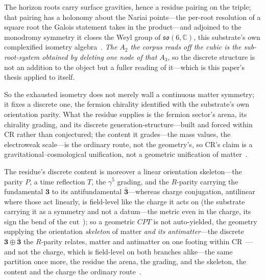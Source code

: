 \documentclass[11pt,a4paper]{article}
\theoremstyle{definition}
\newcommand{\so}{\mathfrak{so}}
\begin{document}
\begin{enumerate}
The horizon roots carry surface gravities, hence a residue pairing on the
triple; that pairing has a holonomy about the Nariai points---the per-root resolution of a square root the
Galois statement takes in the product---and adjoined to the
monodromy symmetry it closes the Weyl group of
$\so(6,\mathbb{C})$, this substrate's own complexified isometry
algebra~\cite{JanzenGroupoid, JanzenAlgebroid}. \emph{The $A_2$ the corpus reads off the cubic is the
sub-root-system obtained by deleting one node of that $A_3$}, so the discrete structure is not an addition to
the object but a fuller reading of it---which is this paper's thesis applied to itself.


So the exhausted isometry does not merely wall a continuous matter symmetry; it
fixes a discrete one, the fermion chirality identified with the substrate's own
orientation parity. What the residue supplies is the fermion sector's arena, its chirality grading, and its discrete generation-structure---built and forced within CR rather than conjectured; the content it grades---the mass values, the electroweak scale---is the ordinary route, not the geometry's, so CR's claim is a gravitational--cosmological unification, not a geometric unification of matter~\cite{JanzenBoundary}. 

The residue's discrete content is moreover a linear orientation skeleton---the parity $P$, a time reflection $T$, the $\gamma^5$ grading, and the $R$-parity carrying the fundamental $\mathbf 3$ to its antifundamental $\bar{\mathbf 3}$---whereas charge conjugation, antilinear where those act linearly, is field-level like the charge it acts on (the substrate carrying it as a symmetry and not a datum---the metric even in the charge, its sign the bend of the cut~\cite{JanzenRange}); so a geometric $CPT$ is not auto-yielded, the geometry supplying the orientation \emph{skeleton} of matter \emph{and its antimatter}---the discrete $\mathbf 3\oplus\bar{\mathbf 3}$ the $R$-parity relates, matter and antimatter on one footing within CR~\cite{JanzenMatter}---and not the charge, which is field-level on both branches alike---the same partition once more, the residue the arena, the grading, and the skeleton, the content and the charge the ordinary route~\cite{JanzenBoundary}. 


\end{enumerate}
\end{document}
